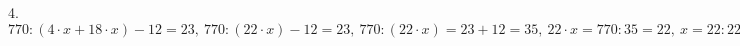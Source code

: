 4. $770:(4\cdot x+18\cdot x)-12=23,\ 770:(22\cdot x)-12=23,\ 770:(22\cdot x)=23+12=35,\ 22\cdot x=770:35=22,\ x=22:22=1.$\\
